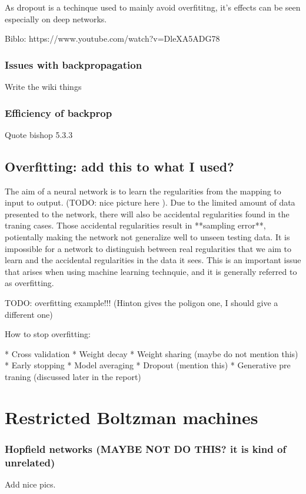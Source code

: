 \documentclass[11pt, fleqn, twoside]{article}
\begin{document}
  As dropout is a techinque used to mainly avoid overfititng, it's effects can be seen especially on deep networks.

  Biblo: https://www.youtube.com/watch?v=DleXA5ADG78


\subsubsection{ Issues with backpropagation}
  Write the wiki things

\subsubsection{ Efficiency of backprop}
  Quote bishop 5.3.3

\subsection{Overfitting: add this to what I used?}

  The aim of a neural network is to learn the regularities from the mapping to input to output. (TODO: nice picture here ). Due to the limited amount of data presented to the network, there will also be accidental regularities found in the traning cases. Those accidental regularities result in **sampling error**, potientally making the network not generalize well to unseen testing data. It is impossible for a network to distinguish between real regularities that we aim to learn and the accidental regularities in the data it sees. This is an important issue that arises when using machine learning technquie, and it is generally referred to as overfitting.

  TODO: overfitting example!!! (Hinton gives the poligon one, I should give a different one)

  How to stop overfitting:

  * Cross validation
  * Weight decay
  * Weight sharing (maybe do not mention this)
  * Early stopping
  * Model averaging
  * Dropout (mention this)
  * Generative pre traning (discussed later in the report)


\section{Restricted Boltzman machines}


\subsubsection{ Hopfield networks (MAYBE NOT DO THIS? it is kind of unrelated)}
  Add nice pics.
\end{document}
